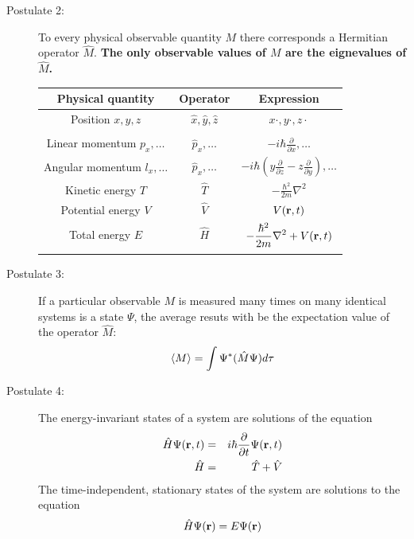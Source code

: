 \documentclass[11pt]{article}
\begin{document}
\begin{outline}
\begin{table}
\begin{center}
\begin{description}
  \item[Postulate 2:]  To every physical observable quantity $M$ there corresponds a
    Hermitian operator $\hat{M}$.  {\bf The only observable values of $M$ are the
      eignevalues of $\hat{M}$.}
    \begin{center}
    \begin{tabular}[h]{ccc}
      \hline
{\bf Physical quantity} & {\bf Operator} & {\bf Expression} \\
\hline
Position $x,y,z$ & $\hat{x},\hat{y},\hat{z}$ & $x\cdot, y\cdot, z\cdot$ \\ \\
Linear momentum $p_x, \ldots$ & $\hat{p}_x,\ldots $ & $\displaystyle -i\hbar\frac{\partial}{\partial
  x},\ldots $\\
Angular momentum $l_x, \ldots$ & $\hat{p}_x,\ldots $ & $\displaystyle -i\hbar \left
  (y\frac{\partial}{\partial z}-z\frac{\partial}{\partial y}\right ), \ldots $ \\
Kinetic energy $T$ & $\hat{T}$ & $\displaystyle -\frac{\hbar^2}{2m}\nabla^2$ \\
Potential energy $V$ & $\hat{V}$ & $V({\bf r},t)$ \\
Total energy $E$ & $\hat{H}$ & $\displaystyle -\frac{\hbar^2}{2m}\nabla^2+V({\bf r},t)$\\ \\
\hline
    \end{tabular}
  \end{center}
    \item[Postulate 3:] {If a particular observable $M$ is measured many times on many
      identical systems is a state $\Psi$, the average resuts with be the expectation
      value of the operator $\hat{M}$:
      \begin{equation*}
        \langle M \rangle = \int \Psi^* (\hat{M}\Psi)d{\bf\tau}
      \end{equation*}}
    \item[Postulate 4:] {The energy-invariant states of a system are solutions of the equation
        \begin{eqnarray*}
          \hat{H}\Psi({\bf r},t) & = & i\hbar\frac{\partial}{\partial t}\Psi({\bf r},t) \\
          \hat{H} & = & \hat{T}+\hat{V}
        \end{eqnarray*}
      The time-independent, stationary states of the system are solutions to the equation
      \begin{equation*}
        \hat{H}\Psi({\bf r}) = E\Psi(\bf{r})
      \end{equation*}
}
\end{description}
\end{center}
\end{table}
\end{outline}
\end{document}
